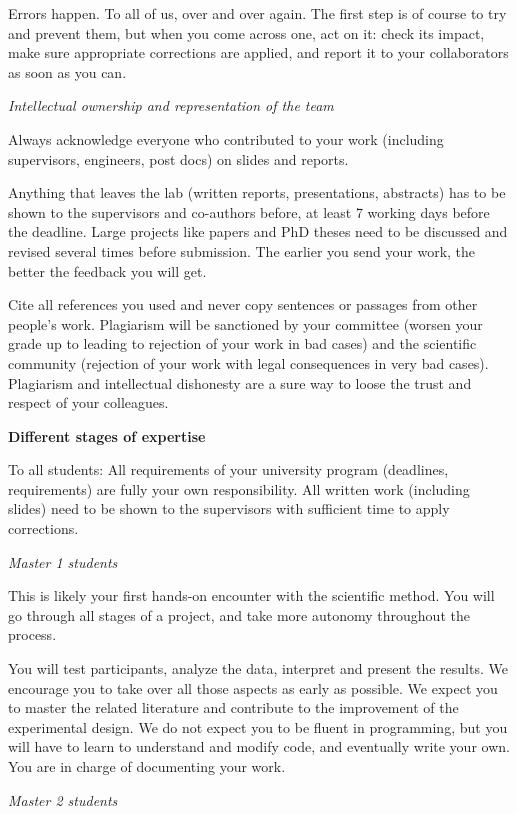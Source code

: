 \documentclass[]{book}
\begin{document}
Errors happen. To all of us, over and over again. The first step is of course to try and prevent them, but when you come across one, act on it: check its impact, make sure appropriate corrections are applied, and report it to your collaborators as soon as you can.

\emph{Intellectual ownership and representation of the team}

Always acknowledge everyone who contributed to your work (including supervisors, engineers, post docs) on slides and reports.

Anything that leaves the lab (written reports, presentations, abstracts) has to be shown to the supervisors and co-authors before, at least 7 working days before the deadline. Large projects like papers and PhD theses need to be discussed and revised several times before submission. The earlier you send your work, the better the feedback you will get.

Cite all references you used and never copy sentences or passages from other people's work. Plagiarism will be sanctioned by your committee (worsen your grade up to leading to rejection of your work in bad cases) and the scientific community (rejection of your work with legal consequences in very bad cases). Plagiarism and intellectual dishonesty are a sure way to loose the trust and respect of your colleagues.

\textbf{Different stages of expertise}

To all students:
All requirements of your university program (deadlines, requirements) are fully your own responsibility.
All written work (including slides) need to be shown to the supervisors with sufficient time to apply corrections.

\emph{Master 1 students}

This is likely your first hands-on encounter with the scientific method. You will go through all stages of a project, and take more autonomy throughout the process.

You will test participants, analyze the data, interpret and present the results.
We encourage you to take over all those aspects as early as possible.
We expect you to master the related literature and contribute to the improvement of the experimental design.
We do not expect you to be fluent in programming, but you will have to learn to understand and modify code, and eventually write your own. You are in charge of documenting your work.

\emph{Master 2 students}
\end{document}
